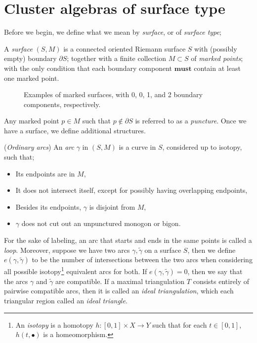 \chapter{Cluster algebras of surface type}
Before we begin, we define what we mean by \emph{surface}, or of \emph{ surface type};
\begin{definition}
A \emph{surface} $(S,M)$ is a connected oriented Riemann surface $S$ with (possibly empty) boundary $\partial S$; together with a finite collection $M \subset S$ of \emph{marked points}; with the only condition that each boundary component $\mathbf{must}$ contain at least one marked point.
\end{definition}
\begin{figure}[H]
    \centering
    
    \caption{Examples of marked surfaces, with 0, 0, 1, and 2 boundary components, respectively.}
\end{figure}
Any marked point $p \in M$ such that $p \notin \partial S$ is referred to as a \emph{puncture}.
Once we have a surface, we define additional structures.\begin{definition}(\emph{Ordinary arcs}) 
    An \emph{arc} $\gamma$ in $(S,M)$ is a curve in $S$, considered up to isotopy, such that;
    \begin{itemize}
        \item Its endpoints are in $M$,
        \item It does not intersect itself, except for possibly having overlapping endpoints,
        \item Besides its endpoints, $\gamma$ is disjoint from $M$,
        \item $\gamma$ does not cut out an unpunctured monogon or bigon.
    \end{itemize}
\end{definition}
For the sake of labeling, an arc that starts and ends in the same points is called a \emph{loop}.
Moreover, suppose we have two arcs $\gamma, \tilde{\gamma}$ on a surface $S$, then we define $e(\gamma, \tilde{\gamma})$ to be the number of intersections between the two arcs when considering all possible isotopy\footnote{An \emph{isotopy} is a homotopy $h: [0,1]\times X \to Y$ such that for each $t \in [0,1]$, $h(t,\bullet)$ is a homeomorphism.} equivalent arcs for both. If $e(\gamma,\tilde{\gamma}) = 0$, then we say that the arcs $\gamma$ and $\tilde{\gamma}$ are compatible. If a maximal triangulation $T$ consists entirely of pairwise compatible arcs, then it is called an \emph{ideal triangulation}, which each triangular region called an \emph{ideal triangle}.
